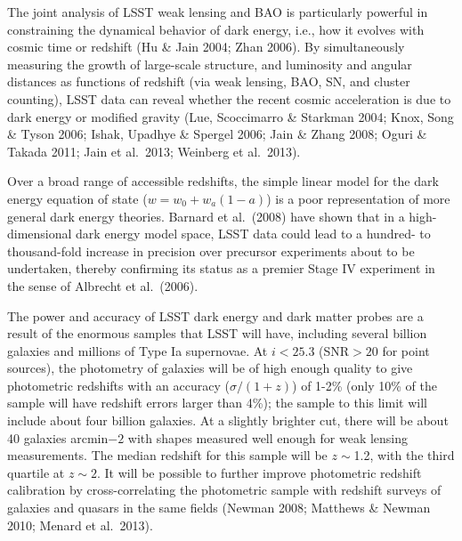 \documentclass{emulateapj}
\begin{document}
The joint analysis of LSST weak lensing and BAO is
particularly powerful in constraining the dynamical behavior of dark
energy, i.e., how it evolves with cosmic time or redshift (Hu \& Jain
2004; Zhan 2006).  By
simultaneously measuring the growth of large-scale structure, and
luminosity and angular distances as functions of redshift (via weak
lensing, BAO, SN, and cluster counting), LSST data can reveal whether
the recent cosmic acceleration is due to dark energy or modified
gravity (Lue, Scoccimarro \& Starkman 2004; Knox, Song \& Tyson 2006;
Ishak, Upadhye \& Spergel 2006; Jain \& Zhang 2008; Oguri \& Takada
2011; Jain et al.~2013; Weinberg et al.~2013).

Over a broad range of accessible redshifts, the simple linear model
for the dark energy equation of state ($w = w_0 + w_a(1-a)$) is a poor representation of more
general dark energy theories. Barnard et al.~(2008) have shown that in a high-dimensional dark energy model space, 
LSST data could lead to a hundred- to thousand-fold increase in precision over 
precursor experiments about to be undertaken, thereby confirming its status as 
a premier Stage IV experiment in the sense of Albrecht et al.~(2006). 

The power and accuracy of LSST dark energy and dark matter probes are
a result of the enormous samples that LSST will have, including 
several billion galaxies and millions of Type Ia
supernovae. At $i < 25.3$ (SNR${}>20$ for point sources), the
photometry of galaxies will be of high enough quality to give
photometric redshifts with an accuracy ($\sigma/(1+z)$) of 1-2\% (only
10\% of the sample will have redshift errors larger than 4\%); the
sample to this limit will include about four billion galaxies.  At a
slightly brighter cut, there will be about 40 galaxies arcmin${-2}$
with shapes measured well enough for weak lensing measurements.  
The median redshift for 
this sample will be $z\sim$1.2, with the third quartile at $z\sim2$. 
It will be possible to further improve photometric redshift calibration
by cross-correlating the photometric sample with redshift surveys of
galaxies and quasars in the same fields (Newman 2008; Matthews \&
Newman 2010; Menard et al.~2013).  
\end{document}
